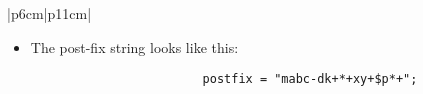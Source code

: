 \begin{center}
\begin{longtable}{ |p{6cm}|p{11cm}| }
\begin{itemize}
{\begin{center}
\begin{verbatim}
                            postfix.append(pop(&OperandStack));
                        \end{verbatim}
                        \begin{tabular}{ c }
                            \texttt{OperandStack =} \\ \\
                        \end{tabular}
                        \begin{bytefield}{10}
                             \\
                        \end{bytefield}
                        \begin{itemize}
                            \item The stack is now empty.
                        \end{itemize}
                    \end{center}

                }
            
            \item The post-fix string looks like this:
                {
                    \begin{verbatim}
                        postfix = "mabc-dk+*+xy+$p*+";
                    \end{verbatim}
                }
        \end{itemize}
    \end{longtable}
\end{center}

